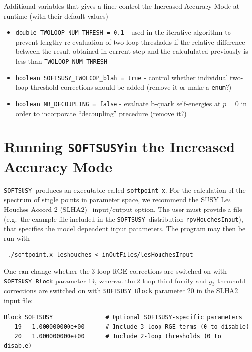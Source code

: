 \documentclass[final,3p,times,pdflatex]{elsarticle}
\def\SOFTSUSY{{\tt SOFTSUSY}}
\def\code#1{\small{\tt #1}\normalsize}
\begin{document}
Additional variables that gives a finer control the Increased Accuracy Mode at runtime (with their default values)
\begin{itemize}
	\item \verb|double TWOLOOP_NUM_THRESH = 0.1|  - used in the iterative algorithm to prevent lengthy re-evaluation of two-loop thresholds 
		if the relative difference between the result obtained in current step and the  calcululated previously is less than \verb|TWOLOOP_NUM_THRESH| 
	\item \verb|boolean SOFTSUSY_TWOLOOP_blah = true| - control whether individual two-loop threshold corrections should be added (remove it or make a \verb|enum|?)
	\item \verb|boolean MB_DECOUPLING = false| - evaluate b-quark self-energies at $p=0$ in order to incorporate ``decoupling'' precedure (remove it?)
\end{itemize}


\section{Running \SOFTSUSY in the Increased Accuracy Mode} 
\label{sec:run}

\SOFTSUSY~produces an executable called \code{softpoint.x}. For the calculation
of the spectrum of single points in parameter space, we recommend the
SUSY Les Houches Accord 2 (SLHA2)~\cite{Allanach:2008qq}  input/output
option. The user must provide a file (e.g.\ the example file included
in the \SOFTSUSY~distribution
\code{rpvHouchesInput}), that specifies the model dependent input
parameters. The program may then be run with
\small
\begin{verbatim}
 ./softpoint.x leshouches < inOutFiles/lesHouchesInput
\end{verbatim}
\normalsize

One can change whether the 3-loop RGE corrections are switched on with
\code{SOFTSUSY Block} parameter 19, whereas the 2-loop third family and $g_3$
threshold corrections 
are switched on with \code{SOFTSUSY Block} parameter 20 in the SLHA2 input file:
\small
\begin{verbatim}
Block SOFTSUSY               # Optional SOFTSUSY-specific parameters
   19   1.000000000e+00      # Include 3-loop RGE terms (0 to disable)
   20   1.000000000e+00      # Include 2-loop thresholds (0 to disable)
\end{verbatim}
\normalsize
\end{document}
